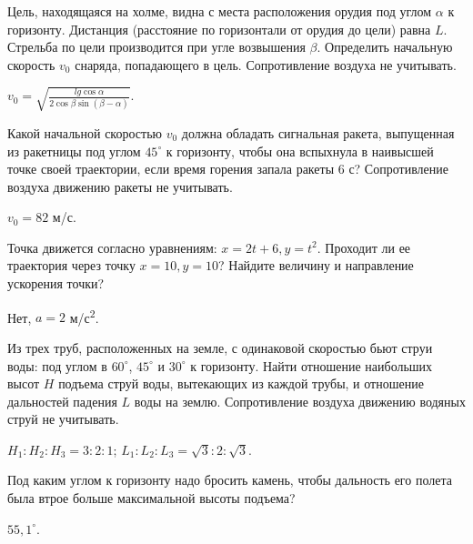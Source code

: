 \begin{ex} %
Цель, находящаяся на холме, видна с места расположения орудия под углом $\alpha$ к горизонту. Дистанция (расстояние по горизонтали от орудия до цели) равна $L$. Стрельба по цели производится при угле возвышения $\beta$. Определить начальную скорость $v_0$ снаряда, попадающего в цель. Сопротивление воздуха не учитывать.
\begin{ans}
$v_0 = \sqrt{\frac{lg \cos \alpha}{2 \cos \beta \sin \left( \beta - \alpha \right)}}$.
\end{ans}
\end{ex}	

\begin{ex} %
Какой начальной скоростью $v_0$ должна обладать сигнальная ракета, выпущенная из ракетницы под углом $45^{\circ}$ к горизонту, чтобы она вспыхнула в наивысшей точке своей траектории, если время горения запала ракеты 6 с? Сопротивление воздуха движению ракеты не учитывать.
\begin{ans}
$v_0 = 82$ м/с.
\end{ans}
\end{ex}	

\begin{ex} %
Точка движется согласно уравнениям: $x = 2t + 6, y = t^2$. Проходит ли ее траектория через точку $x = 10, y = 10$? Найдите величину и направление ускорения точки?
\begin{ans}
Нет, $a = 2$ м/с\textsuperscript{2}.
\end{ans}
\end{ex}	

\begin{ex} %
Из трех труб, расположенных на земле, с одинаковой скоростью бьют струи воды: под углом в $60^{\circ}$, $45^{\circ}$ и $30^{\circ}$ к горизонту. Найти отношение наибольших высот $H$ подъема струй воды, вытекающих из каждой трубы, и отношение дальностей падения $L$ воды на землю. Сопротивление воздуха движению водяных струй не учитывать.
\begin{ans}
$H_1 : H_2 : H_3 = 3 : 2 : 1$; $L_1 : L_2 : L_3 = \sqrt{3} : 2 : \sqrt{3}$.
\end{ans}
\end{ex}	

\begin{ex} %
Под каким углом к горизонту надо бросить камень, чтобы дальность его полета была втрое больше максимальной высоты подъема?
\begin{ans}
$55,1^{ \circ }$.
\end{ans}
\end{ex}	

